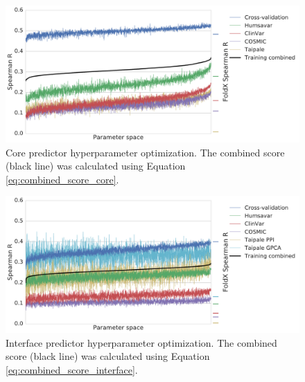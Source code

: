 
\begin{figure}[tb]
	\includegraphics[width=0.9\linewidth]{static/elaspic_training_set/machine_learning/gridsearch_core.pdf}
	\caption[Core predictor hyperparameter optimization.]{
        Core predictor hyperparameter optimization.
        The combined score (black line) was calculated using Equation \ref{eq:combined_score_core}.
    }
	\label{fig:gridsearch_core}
\end{figure}

\begin{figure}[tb]
	\includegraphics[width=0.9\linewidth]{static/elaspic_training_set/machine_learning/gridsearch_interface.pdf}
    \caption[Interface predictor hyperparameter optimization.]{
        Interface predictor hyperparameter optimization.
        The combined score (black line) was calculated using Equation \ref{eq:combined_score_interface}.
    }
	\label{fig:gridsearch_interface}
\end{figure}

\clearpage

